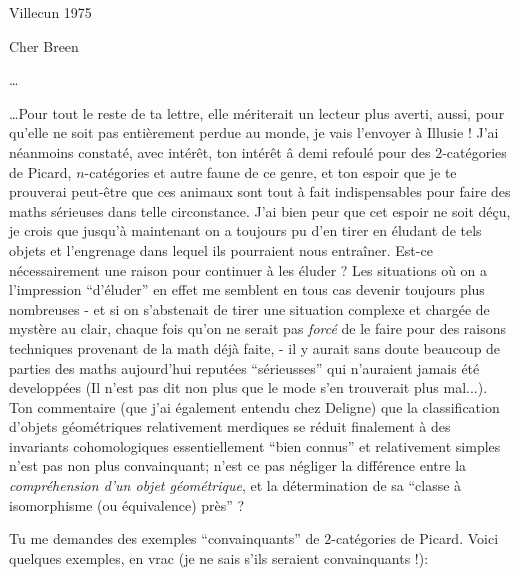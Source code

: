\bigskip

\par\hfill Villecun 1975\par

Cher Breen

\dots

\setcounter{section}{0}

\label{sec:app1}%
\dots Pour tout le reste de ta lettre, elle mériterait un lecteur plus averti, aussi, pour qu'elle ne soit pas entièrement perdue au monde, je vais l'envoyer à Illusie ! J'ai néanmoins constaté, avec intérêt, ton intérêt â demi refoulé pour des $2$-catégories de Picard, $n$-catégories et autre faune de ce genre, et ton espoir que je te prouverai peut-être que ces animaux sont tout à fait indispensables pour faire des maths sérieuses dans telle circonstance. J'ai bien peur que cet espoir ne soit dé\c{c}u, je crois que jusqu'à maintenant on a toujours pu d'en tirer en éludant de tels objets et l'engrenage dans lequel ils pourraient nous entraîner. Est-ce nécessairement une raison pour continuer à les éluder ? Les situations où on a l'impression ``d'éluder'' en effet me semblent en tous cas devenir toujours plus nombreuses - et si on s'abstenait de tirer une situation complexe et chargée de mystère au clair, chaque fois qu'on ne serait pas \emph{forcé} de le faire pour des raisons techniques provenant de la math déjà faite, - il y aurait sans doute beaucoup de parties des maths aujourd'hui reputées ``sérieusses'' qui n'auraient jamais été developpées (Il n'est pas dit non plus que le mode s'en trouverait plus mal...). Ton commentaire (que j'ai également entendu chez Deligne) que la classification d'objets géométriques relativement merdiques se réduit finalement à des invariants cohomologiques essentiellement ``bien connus'' et relativement simples n'est pas non plus convainquant; n'est ce pas négliger la différence entre la \emph{compréhension d'un objet géométrique}, et la détermination de sa ``classe à isomorphisme (ou équivalence) près'' ?

Tu me demandes des exemples ``convainquants'' de $2$-catégories de Picard. Voici quelques exemples, en vrac (je ne sais s'ils seraient convainquants !):

